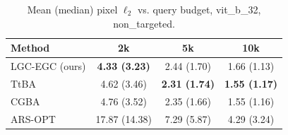\begin{table}[t]
\centering\footnotesize
\caption{Mean (median) pixel $\ell_2$ vs. query budget, vit\_b\_32, non\_targeted.}
\begin{tabular}{lccc}
\toprule
Method & 2k & 5k & 10k \\
\midrule
LGC-EGC (ours) & \textbf{4.33 (3.23)} & 2.44 (1.70) & 1.66 (1.13) \\
TtBA & 4.62 (3.46) & \textbf{2.31 (1.74)} & \textbf{1.55 (1.17)} \\
CGBA & 4.76 (3.52) & 2.35 (1.66) & 1.55 (1.16) \\
ARS-OPT & 17.87 (14.38) & 7.29 (5.87) & 4.29 (3.24) \\
\bottomrule
\end{tabular}
\end{table}

